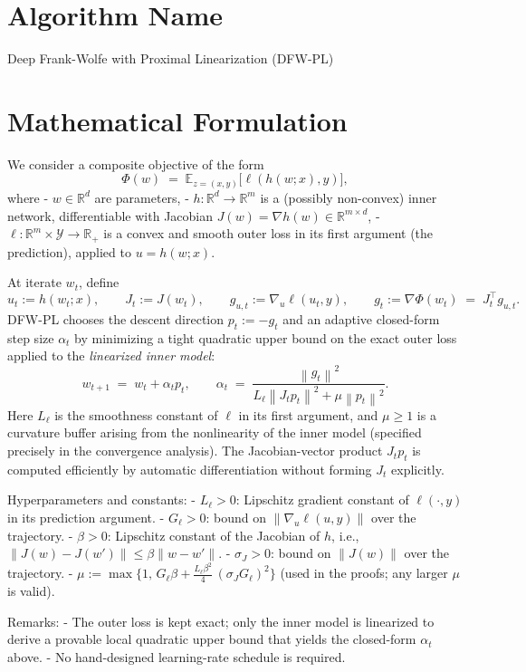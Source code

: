 \documentclass[11pt]{article}
\newcommand{\R}{\mathbb{R}}
\newcommand{\E}{\mathbb{E}}
\newcommand{\norm}[1]{\left\lVert #1 \right\rVert}
\begin{document}
\section*{Algorithm Name}
Deep Frank-Wolfe with Proximal Linearization (DFW-PL)

\section*{Mathematical Formulation}
We consider a composite objective of the form
\[
\Phi(w) \;=\; \E_{z=(x,y)}\big[\ell(h(w;x),y)\big],
\]
where
- $w\in\R^d$ are parameters,
- $h:\R^d\to\R^m$ is a (possibly non-convex) inner network, differentiable with Jacobian $J(w)=\nabla h(w)\in\R^{m\times d}$,
- $\ell:\R^m\times\mathcal{Y}\to\R_+$ is a convex and smooth outer loss in its first argument (the prediction), applied to $u=h(w;x)$.

At iterate $w_t$, define
\[
u_t := h(w_t;x),\qquad J_t := J(w_t),\qquad g_{u,t} := \nabla_u \ell(u_t,y),\qquad g_t := \nabla \Phi(w_t) \;=\; J_t^\top g_{u,t}.
\]
DFW-PL chooses the descent direction $p_t := -g_t$ and an adaptive closed-form step size $\alpha_t$ by minimizing a tight quadratic upper bound on the exact outer loss applied to the \emph{linearized inner model}:
\[
w_{t+1} \;=\; w_t + \alpha_t p_t,\qquad 
\alpha_t \;=\; \frac{\norm{g_t}^2}{L_\ell \norm{J_t p_t}^2 + \mu \norm{p_t}^2}.
\]
Here $L_\ell$ is the smoothness constant of $\ell$ in its first argument, and $\mu\ge 1$ is a curvature buffer arising from the nonlinearity of the inner model (specified precisely in the convergence analysis). The Jacobian-vector product $J_t p_t$ is computed efficiently by automatic differentiation without forming $J_t$ explicitly.

Hyperparameters and constants:
- $L_\ell>0$: Lipschitz gradient constant of $\ell(\cdot,y)$ in its prediction argument.
- $G_\ell>0$: bound on $\|\nabla_u \ell(u,y)\|$ over the trajectory.
- $\beta>0$: Lipschitz constant of the Jacobian of $h$, i.e., $\|J(w)-J(w')\|\le \beta \|w-w'\|$.
- $\sigma_J>0$: bound on $\|J(w)\|$ over the trajectory.
- $\mu:=\max\!\Big\{1,\, G_\ell \beta + \frac{L_\ell \beta^2}{4}\,(\sigma_J G_\ell)^2\Big\}$ (used in the proofs; any larger $\mu$ is valid).

Remarks:
- The outer loss is kept exact; only the inner model is linearized to derive a provable local quadratic upper bound that yields the closed-form $\alpha_t$ above.
- No hand-designed learning-rate schedule is required.
\end{document}
